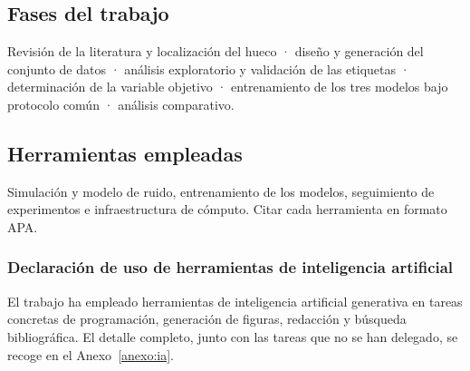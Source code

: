\subsection{Fases del trabajo}
\label{sec:fases}
Revisión de la literatura y localización del hueco · diseño y generación del conjunto de
datos · análisis exploratorio y validación de las etiquetas · determinación de la variable
objetivo · entrenamiento de los tres modelos bajo protocolo común · análisis comparativo.

\subsection{Herramientas empleadas}
\label{sec:herramientas}
Simulación y modelo de ruido, entrenamiento de los modelos, seguimiento de experimentos e
infraestructura de cómputo. Citar cada herramienta en formato APA.

\subsubsection{Declaración de uso de herramientas de inteligencia artificial}
El trabajo ha empleado herramientas de inteligencia artificial generativa en tareas
concretas de programación, generación de figuras, redacción y búsqueda bibliográfica. El
detalle completo, junto con las tareas que no se han delegado, se recoge en el
Anexo~\ref{anexo:ia}.
